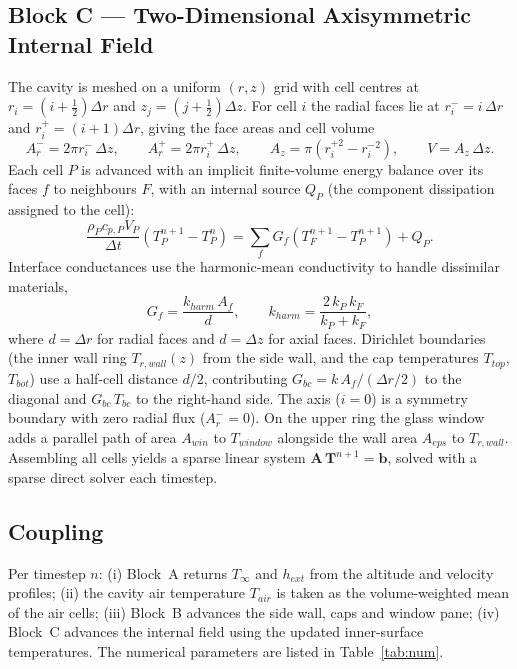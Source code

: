 \documentclass[11pt,a4paper]{article}
\begin{document}
\subsection{Block C --- Two-Dimensional Axisymmetric Internal Field}
The cavity is meshed on a uniform $(r,z)$ grid with cell centres at
$r_i=(i+\tfrac12)\Delta r$ and $z_j=(j+\tfrac12)\Delta z$. For cell $i$ the radial faces
lie at $r_i^- = i\,\Delta r$ and $r_i^+ = (i+1)\Delta r$, giving the face areas and cell
volume
\begin{equation}
A_{r}^{-} = 2\pi r_i^{-}\,\Delta z,\qquad
A_{r}^{+} = 2\pi r_i^{+}\,\Delta z,\qquad
A_{z} = \pi\!\left(r_i^{+2}-r_i^{-2}\right),\qquad
V = A_z\,\Delta z .
\end{equation}
Each cell $P$ is advanced with an implicit finite-volume energy balance over its faces
$f$ to neighbours $F$, with an internal source $Q_P$ (the component dissipation assigned
to the cell):
\begin{equation}
\frac{\rho_P c_{p,P} V_P}{\Delta t}\left(T_P^{n+1}-T_P^{n}\right)
= \sum_{f} G_f\left(T_F^{n+1}-T_P^{n+1}\right) + Q_P .
\end{equation}
Interface conductances use the harmonic-mean conductivity to handle dissimilar
materials,
\begin{equation}
G_f = \frac{k_{harm}\,A_f}{d},\qquad
k_{harm} = \frac{2\,k_P\,k_F}{k_P+k_F},
\end{equation}
where $d=\Delta r$ for radial faces and $d=\Delta z$ for axial faces. Dirichlet
boundaries (the inner wall ring $T_{r,wall}(z)$ from the side wall, and the cap
temperatures $T_{top}$, $T_{bot}$) use a half-cell distance $d/2$, contributing
$G_{bc}=k\,A_f/(\Delta r/2)$ to the diagonal and $G_{bc}\,T_{bc}$ to the right-hand side.
The axis ($i=0$) is a symmetry boundary with zero radial flux ($A_r^{-}=0$). On the
upper ring the glass window adds a parallel path of area $A_{win}$ to $T_{window}$
alongside the wall area $A_{eps}$ to $T_{r,wall}$. Assembling all cells yields a sparse
linear system $\mathbf{A}\,\mathbf{T}^{n+1}=\mathbf{b}$, solved with a sparse direct
solver each timestep.

\subsection{Coupling}
Per timestep $n$: (i) Block~A returns $T_\infty$ and $h_{ext}$ from the altitude and
velocity profiles; (ii) the cavity air temperature $T_{air}$ is taken as the
volume-weighted mean of the air cells; (iii) Block~B advances the side wall, caps and
window pane; (iv) Block~C advances the internal field using the updated inner-surface
temperatures. The numerical parameters are listed in Table~\ref{tab:num}.
\end{document}
